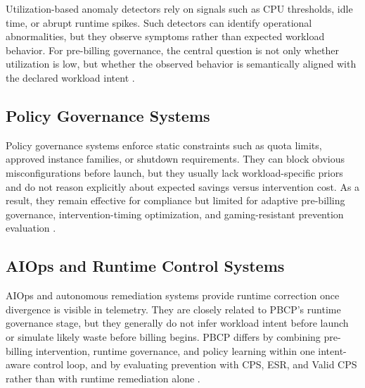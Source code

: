 Utilization-based anomaly detectors rely on signals such as CPU thresholds, idle
time, or abrupt runtime spikes. Such detectors can identify operational
abnormalities, but they observe symptoms rather than expected workload behavior.
For pre-billing governance, the central question is not only whether utilization
is low, but whether the observed behavior is semantically aligned with the
declared workload intent \cite{chandola2009,zhong2023}.

\subsection{Policy Governance Systems}

Policy governance systems enforce static constraints such as quota limits,
approved instance families, or shutdown requirements. They can block obvious
misconfigurations before launch, but they usually lack workload-specific priors
and do not reason explicitly about expected savings versus intervention cost.
As a result, they remain effective for compliance but limited for adaptive
pre-billing governance, intervention-timing optimization, and gaming-resistant
prevention evaluation \cite{opa-docs}.

\subsection{AIOps and Runtime Control Systems}

AIOps and autonomous remediation systems provide runtime correction once
divergence is visible in telemetry. They are closely related to PBCP's runtime
governance stage, but they generally do not infer workload intent before launch
or simulate likely waste before billing begins. PBCP differs by combining
pre-billing intervention, runtime governance, and policy learning within one
intent-aware control loop, and by evaluating prevention with CPS, ESR, and
Valid CPS rather than with runtime remediation alone
\cite{notaro2020,autopilot2020,kubernetes-hpa}.
